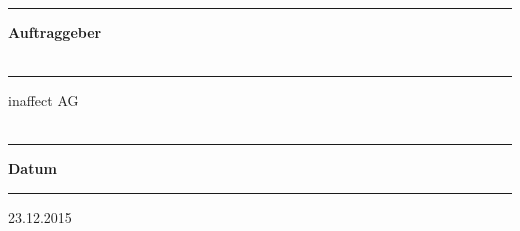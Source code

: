 \begin{titlepage}
\begin{minipage}[b]{0.91\textwidth}
	\begin{minipage}[b]{0.27\textwidth}
	\hrule\vskip 0.5cm
		\textbf{Auftraggeber}\\
		\\
	\end{minipage}
	\begin{minipage}[b]{0.03\textwidth}
	\hskip 0.5cm
	\end{minipage}
	\begin{minipage}[b]{0.7\textwidth}
	\hrule\vskip 0.5cm
		inaffect AG\\
		\\
	\end{minipage}
	
	
	\begin{minipage}[b]{0.27\textwidth}
	\hrule\vskip 0.5cm
		\textbf{Datum}
	\end{minipage}
	\begin{minipage}[b]{0.03\textwidth}
	\hskip 0.5cm
	\end{minipage}
	\begin{minipage}[b]{0.7\textwidth}
	\hrule\vskip 0.5cm
		23.12.2015
	\end{minipage}
\end{minipage}
\vskip 0.5cm



\end{titlepage}
